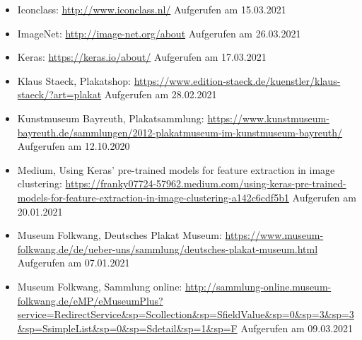 \documentclass[a4paper,12pt,ngerman]{article}
\begin{document}
\begin{itemize}
\item Iconclass: \newline \href{http://www.iconclass.nl/}{http://www.iconclass.nl/} \newline Aufgerufen am 15.03.2021
\item ImageNet: \newline \href{http://image-net.org/about}{http://image-net.org/about} \newline Aufgerufen am 26.03.2021
\item Keras: \newline \href{https://keras.io/about/}{https://keras.io/about/} \newline Aufgerufen am 17.03.2021
\item Klaus Staeck, Plakatshop: \newline \href{https://www.edition-staeck.de/kuenstler/klaus-staeck/?art=plakat}{https://www.edition-staeck.de/kuenstler/klaus-staeck/?art=plakat} \newline Aufgerufen am 28.02.2021
\item Kunstmuseum Bayreuth, Plakatsammlung: \newline \href{https://www.kunstmuseum-bayreuth.de/sammlungen/2012-plakatmuseum-im-kunstmuseum-bayreuth/}{https://www.kunstmuseum-bayreuth.de/sammlungen/2012-plakatmuseum-im-kunstmuseum-bayreuth/} \newline Aufgerufen am 12.10.2020
\item Medium, Using Keras' pre-trained models for feature extraction in image clustering: \newline \href{https://franky07724-57962.medium.com/using-keras-pre-trained-models-for-feature-extraction-in-image-clustering-a142c6cdf5b1}{https://franky07724-57962.medium.com/using-keras-pre-trained-models-for-feature-extraction-in-image-clustering-a142c6cdf5b1} \newline Aufgerufen am 20.01.2021
\item Museum Folkwang, Deutsches Plakat Museum: \newline \href{https://www.museum-folkwang.de/de/ueber-uns/sammlung/deutsches-plakat-museum.html}{https://www.museum-folkwang.de/de/ueber-uns/sammlung/deutsches-plakat-museum.html} \newline Aufgerufen am 07.01.2021
\item Museum Folkwang, Sammlung online: \newline \href{http://sammlung-online.museum-folkwang.de/eMP/eMuseumPlus?service=RedirectService\&sp=Scollection\&sp=SfieldValue\&sp=0\&sp=3\&sp=3\&sp=SsimpleList\&sp=0\&sp=Sdetail\&sp=1\&sp=F}{http://sammlung-online.museum-folkwang.de/eMP/eMuseumPlus?service=\newline RedirectService\&sp=Scollection\&sp=SfieldValue\&sp=0\&sp=3\&sp=3\&sp=\newline SsimpleList\&sp=0\&sp=Sdetail\&sp=1\&sp=F} \newline Aufgerufen am 09.03.2021

\end{itemize}
\end{document}
